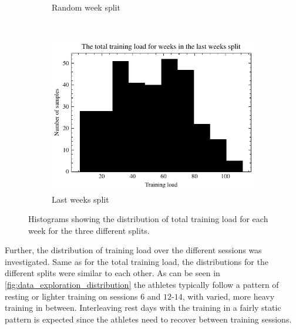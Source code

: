 \begin{figure}[ht]
\begin{subfigure}[t]{0.48\textwidth}
        \captionsetup{width=.9\linewidth}
        \caption{Random week split}
    \end{subfigure}\\[1ex]
    \begin{subfigure}[t]{0.48\textwidth}
        \centering
        \includegraphics[width=\textwidth]{chapters/figures/data_exploration/last_weeks_hist.pdf}
        \captionsetup{width=.9\linewidth}
        \caption{Last weeks split}
    \end{subfigure}
    \caption{Histograms showing the distribution of total training load for each week for the three different splits.}
    \label{fig:data_exploration_split_histogram}
\end{figure}

Further, the distribution of training load over the different sessions was investigated.
Same as for the total training load, the distributions for the different splits were similar to each other. 
As can be seen in \cref{fig:data_exploration_distribution} the athletes typically follow a pattern of resting or lighter training on sessions $6$ and $12$-$14$, with varied, more heavy training in between.
Interleaving rest days with the training in a fairly static pattern is expected since the athletes need to recover between training sessions.

